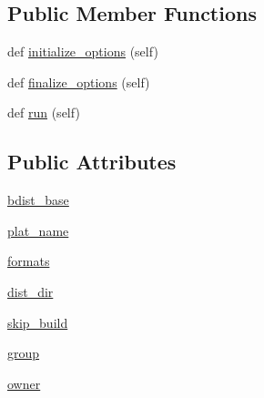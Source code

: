 \subsection*{Public Member Functions}
\begin{DoxyCompactItemize}
\item 
def \hyperlink{classsetuptools_1_1__distutils_1_1command_1_1bdist_1_1bdist_a56440de9cfaed20aa8b3f51ac21c3ce8}{initialize\+\_\+options} (self)
\item 
def \hyperlink{classsetuptools_1_1__distutils_1_1command_1_1bdist_1_1bdist_af1c3c83bcaf2beffe2e4a29c5f4427a9}{finalize\+\_\+options} (self)
\item 
def \hyperlink{classsetuptools_1_1__distutils_1_1command_1_1bdist_1_1bdist_ae911072daf9a639873de914654353dcb}{run} (self)
\end{DoxyCompactItemize}
\subsection*{Public Attributes}
\begin{DoxyCompactItemize}
\item 
\hyperlink{classsetuptools_1_1__distutils_1_1command_1_1bdist_1_1bdist_a57278335c01bc86aabec265a330328c9}{bdist\+\_\+base}
\item 
\hyperlink{classsetuptools_1_1__distutils_1_1command_1_1bdist_1_1bdist_a53f6cfb5ed9840147493a347cebea9be}{plat\+\_\+name}
\item 
\hyperlink{classsetuptools_1_1__distutils_1_1command_1_1bdist_1_1bdist_aa46699c09cc5c72fbdb1e1a72a013bd8}{formats}
\item 
\hyperlink{classsetuptools_1_1__distutils_1_1command_1_1bdist_1_1bdist_a4123d75b3357c5579cbf62591083cc2e}{dist\+\_\+dir}
\item 
\hyperlink{classsetuptools_1_1__distutils_1_1command_1_1bdist_1_1bdist_a91d67905041dde36541922b2eb17aff3}{skip\+\_\+build}
\item 
\hyperlink{classsetuptools_1_1__distutils_1_1command_1_1bdist_1_1bdist_a190a25c6bb2b0629d036df76af797c89}{group}
\item 
\hyperlink{classsetuptools_1_1__distutils_1_1command_1_1bdist_1_1bdist_a74ccefd320872fbfe5692718e1800090}{owner}
\end{DoxyCompactItemize}
